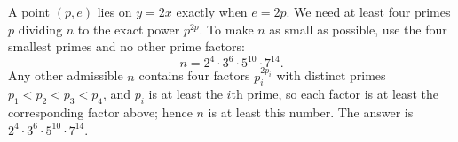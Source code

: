 A point $(p,e)$ lies on $y=2x$ exactly when $e=2p$. We need at least four primes $p$ dividing $n$ to the exact power $p^{2p}$. To make $n$ as small as possible, use the four smallest primes and no other prime factors:
\[n=2^4\cdot3^6\cdot5^{10}\cdot7^{14}.\]
Any other admissible $n$ contains four factors $p_i^{2p_i}$ with distinct primes $p_1<p_2<p_3<p_4$, and $p_i$ is at least the $i$th prime, so each factor is at least the corresponding factor above; hence $n$ is at least this number. The answer is $\boxed{2^4\cdot3^6\cdot5^{10}\cdot7^{14}}$.
